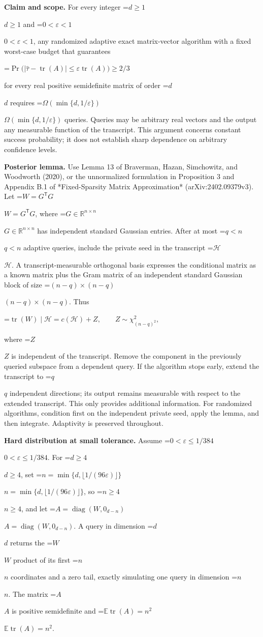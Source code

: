 \documentclass[10pt,a4paper]{article}
\newcommand{\AtlasMath}[1]{\par\begingroup\centering\setbox0=\hbox{$\displaystyle #1$}\ifdim\wd0>1.4\linewidth\typeout{ATLAS WIDE FORMULA: \the\wd0}\fi\ifdim\wd0>\linewidth\resizebox{\linewidth}{!}{\box0}\else\box0\fi\par\endgroup}
\newcommand{\AtlasInlineMath}[1]{\begingroup\setbox0=\hbox{$#1$}\ifdim\wd0>.4\linewidth\endgroup\AtlasMath{#1}\else\endgroup$#1$\fi}
\begin{document}
\textbf{Claim and scope.} For every integer \AtlasInlineMath{d\ge1} and \AtlasInlineMath{0<\varepsilon<1}, any randomized adaptive exact matrix-vector algorithm with a fixed worst-case budget that guarantees

\AtlasMath{\Pr\bigl(|\widehat\tau-\operatorname{tr}(A)|\le\varepsilon\operatorname{tr}(A)\bigr)\ge2/3}

for every real positive semidefinite matrix of order \AtlasInlineMath{d} requires \AtlasInlineMath{\Omega(\min\{d,1/\varepsilon\})} queries. Queries may be arbitrary real vectors and the output any measurable function of the transcript. This argument concerns constant success probability; it does not establish sharp dependence on arbitrary confidence levels.

\textbf{Posterior lemma.} Use Lemma 13 of Braverman, Hazan, Simchowitz, and Woodworth (2020), or the unnormalized formulation in Proposition 3 and Appendix B.1 of *Fixed-Sparsity Matrix Approximation* (arXiv:2402.09379v3). Let \AtlasInlineMath{W=G^{\mathsf T}G}, where \AtlasInlineMath{G\in\mathbb R^{n\times n}} has independent standard Gaussian entries. After at most \AtlasInlineMath{q<n} adaptive queries, include the private seed in the transcript \AtlasInlineMath{\mathcal H}. A transcript-measurable orthogonal basis expresses the conditional matrix as a known matrix plus the Gram matrix of an independent standard Gaussian block of size \AtlasInlineMath{(n-q)\times(n-q)}. Thus

\AtlasMath{\operatorname{tr}(W)\mid\mathcal H=c(\mathcal H)+Z,\qquad Z\sim\chi^2_{(n-q)^2},}

where \AtlasInlineMath{Z} is independent of the transcript. Remove the component in the previously queried subspace from a dependent query. If the algorithm stops early, extend the transcript to \AtlasInlineMath{q} independent directions; its output remains measurable with respect to the extended transcript. This only provides additional information. For randomized algorithms, condition first on the independent private seed, apply the lemma, and then integrate. Adaptivity is preserved throughout.

\textbf{Hard distribution at small tolerance.} Assume \AtlasInlineMath{0<\varepsilon\le1/384}. For \AtlasInlineMath{d\ge4}, set \AtlasInlineMath{n=\min\{d,\lfloor1/(96\varepsilon)\rfloor\}}, so \AtlasInlineMath{n\ge4}, and let \AtlasInlineMath{A=\operatorname{diag}(W,0_{d-n})}. A query in dimension \AtlasInlineMath{d} returns the \AtlasInlineMath{W} product of its first \AtlasInlineMath{n} coordinates and a zero tail, exactly simulating one query in dimension \AtlasInlineMath{n}. The matrix \AtlasInlineMath{A} is positive semidefinite and \AtlasInlineMath{\mathbb E\operatorname{tr}(A)=n^2}.
\end{document}
